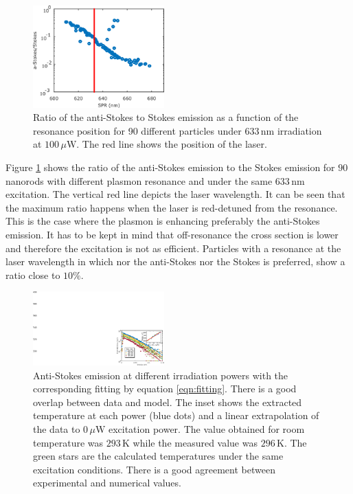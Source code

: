 \documentclass[journal=nalefd,manuscript=letter]{achemso}
\newcommand{\K}{\ensuremath{\,\textrm{K}}}
\newcommand{\nm}{\ensuremath{\,\textrm{nm}}}
\newcommand{\uW}{\ensuremath{\,\mu\textrm{W}}}
\begin{document}
\begin{figure}[htp] \centering
\includegraphics[width=0.45\textwidth]{Figures/Supplementary/02_AS_vs_S_SPR/02_AS_vs_S_SPR.png}
\caption{Ratio of the anti-Stokes to Stokes emission as a function of the
resonance position for 90 different particles under $633\nm$
irradiation at $100\uW$. The red line shows the position of the laser.}
	\label{fig:ASS-ratio}
\end{figure}

Figure \ref{fig:ASS-ratio} shows the ratio of the anti-Stokes emission to the
Stokes emission for $90$ nanorods with different plasmon resonance and under the
same $633\nm$ excitation. The vertical red line depicts the laser wavelength. It
can be seen that the maximum ratio happens when the laser is red-detuned from
the resonance. This is the case where the plasmon is enhancing preferably the
anti-Stokes emission. It has to be kept in mind that off-resonance the cross
section is lower and therefore the excitation is not as efficient. Particles
with a resonance at the laser wavelength in which nor the anti-Stokes nor the
Stokes is preferred, show a ratio close to $10\%$.

\begin{figure}[htp] \centering
\includegraphics[width=0.45\textwidth]{Figures/03_Fit_Of_AS/03_Log_Fit_AS.png}
\caption{Anti-Stokes emission at different irradiation powers with the
corresponding fitting by equation \ref{eqn:fitting}. There is a good overlap
between data and model. The inset shows the extracted temperature at each
power (blue dots) and a linear extrapolation of the data to $0\uW$ excitation
power. The value obtained for room temperature was $293\K$ while the measured
value was $296\K$. The green stars are the calculated temperatures under the
same excitation conditions. There is a good agreement between experimental and
numerical values.}
	\label{fig:AS_in_Log}
\end{figure}
\end{document}

